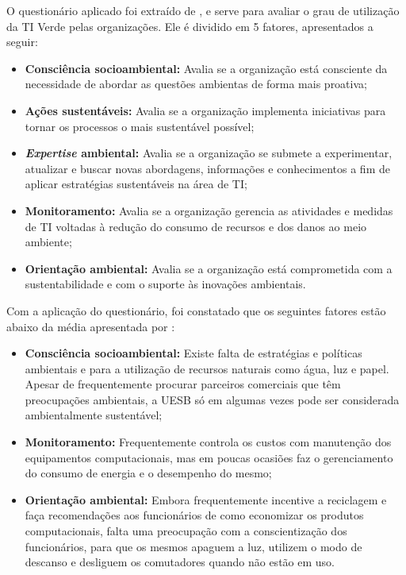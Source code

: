 O questionário aplicado foi extraído de , e serve para avaliar o grau de utilização da TI Verde pelas organizações. Ele é dividido em 5 fatores, apresentados a seguir: 
\begin{itemize}
    \item  \textbf{Consciência socioambiental:} Avalia se a organização está consciente da necessidade de abordar as questões ambientas de forma mais proativa;
    \item \textbf{Ações sustentáveis:} Avalia se a organização implementa iniciativas para tornar os processos o mais sustentável possível;
    \item \textbf{\textit{Expertise} ambiental:} Avalia se a organização se submete a experimentar, atualizar e buscar novas abordagens, informações e conhecimentos a fim de aplicar estratégias sustentáveis na área de TI;
    \item \textbf{Monitoramento:} Avalia se a organização gerencia as atividades e medidas de TI voltadas à redução do consumo de recursos e dos danos ao meio ambiente;
    \item \textbf{Orientação ambiental:} Avalia se a organização está comprometida com a sustentabilidade e com o suporte às inovações ambientais.
\end{itemize}

Com a aplicação do questionário, foi constatado que os seguintes fatores estão abaixo da média apresentada por : 
\begin{itemize}
    \item \textbf{Consciência socioambiental:} Existe falta de estratégias e políticas ambientais e para a utilização de recursos naturais como água, luz e papel. Apesar de frequentemente procurar parceiros comerciais que têm preocupações ambientais, a UESB só em algumas vezes pode ser considerada ambientalmente sustentável; 
    \item \textbf{Monitoramento:} Frequentemente controla os custos com manutenção dos equipamentos computacionais, mas em poucas ocasiões faz o gerenciamento do consumo de energia e o desempenho do mesmo;
    \item \textbf{Orientação ambiental:} Embora frequentemente incentive a reciclagem e faça recomendações aos funcionários de como economizar os produtos computacionais, falta uma preocupação com a conscientização dos funcionários, para que os mesmos apaguem a luz, utilizem o modo de descanso e desliguem os comutadores quando não estão em uso.
\end{itemize}

